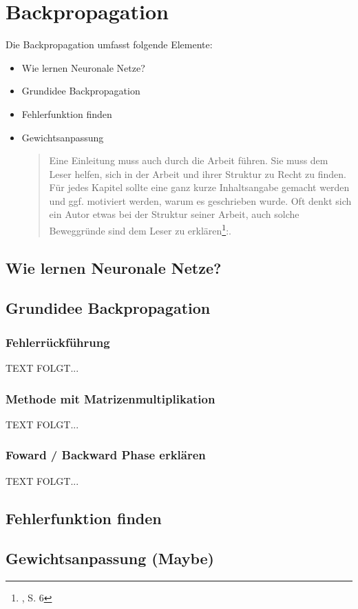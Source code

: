\newpage
\thispagestyle{empty}
\section{Backpropagation}\label{Backpropagation}   

\vspace{1cm}
\begin{tcolorbox}[title={Inhalt}]
Die Backpropagation umfasst folgende Elemente:
\begin{itemize}
\item Wie lernen Neuronale Netze?
\item Grundidee Backpropagation
\item Fehlerfunktion finden
\item Gewichtsanpassung
\begin{quotation}
Eine Einleitung muss auch durch die Arbeit führen. Sie muss dem Leser helfen, sich in der Arbeit und ihrer Struktur zu Recht zu finden. Für jedes Kapitel sollte eine ganz kurze Inhaltsangabe gemacht werden und ggf. motiviert werden, warum es geschrieben wurde. Oft denkt sich ein Autor etwas bei der Struktur seiner Arbeit, auch solche Beweggründe sind dem Leser zu erklären\footnote{\cite{BBoJ}, S. 6}:. 
\end{quotation}
\end{itemize}
\end{tcolorbox}

\subsection{Wie lernen Neuronale Netze?}\label{}

\subsection{Grundidee Backpropagation}\label{}
\subsubsection{Fehlerrückführung}\label{Abs.1}
  TEXT FOLGT...

\subsubsection{Methode mit Matrizenmultiplikation}\label{Abs.2}
  TEXT FOLGT...

\subsubsection{Foward / Backward Phase erklären}\label{Abs.3}
  TEXT FOLGT...

\subsection{Fehlerfunktion finden}\label{}

\subsection{Gewichtsanpassung (Maybe)}\label{}
